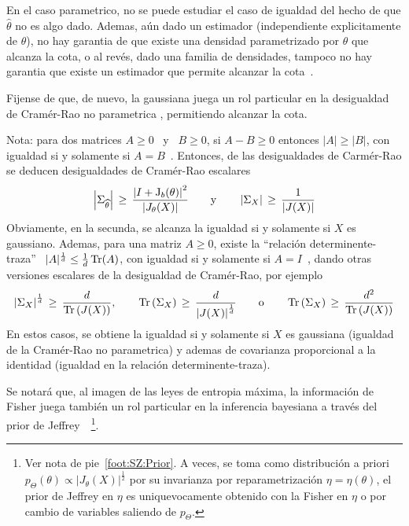 %
\noindent En el  caso parametrico, no se puede estudiar el  caso de igualdad del
hecho  de  que  $\widehat{\theta}$ no  es  algo  dado.   Ademas, a\'un  dado  un
estimador  (independiente explicitamente de  $\theta$), no  hay garantia  de que
existe  una  densidad parametrizado  por  $\theta$ que  alcanza  la  cota, o  al
rev\'es, dado una  familia de densidades, tampoco no hay  garantia que existe un
estimador que permite alcanzar la cota~\cite{CovTho06,  Kay93}.

Fijense de que, de nuevo, la gaussiana juega un rol particular en la desigualdad
de Cram\'er-Rao no parametrica , permitiendo alcanzar la cota.

Nota: para dos  matrices $A \ge 0$  \ y \ $B \ge  0$, si $A - B  \ge 0$ entonces
$|A|  \ge  |B|$,   con  igualdad  si  y  solamente   si  $A  =  B$~\cite[cap.~1,
teorema~25]{MagNeu99}.   Entonces,  de  las  desigualdades  de  Carm\'er-Rao  se
deducen     desigualdades     de     Cram\'er-Rao    escalares
%
\[
\left|   \Sigma_{\widehat{\theta}}  \right|   \,   \ge  \,   \frac{\left|  I   +
    \operatorname{J}_b(\theta) \right|^2}{\left| J_\theta(X) \right|} \qquad \mbox{y} \qquad
\left| \Sigma_X \right| \, \ge \, \frac{1}{\left| J(X) \right|}
\]
%
Obviamente,  en la secunda,  se alcanza  la igualdad  si y  solamente si  $X$ es
gaussiano.  Ademas,  para   una  matriz  $A  \ge  0$,   existe  la  ``relaci\'on
determinente-traza''  \ $|A|^{\frac1d} \le  \frac1d \operatorname{Tr}(A)$,  con igualdad  si y
solamente  si $A  = I$~\cite[cap.~11,  sec.~4]{MagNeu99}, dando  otras versiones
escalares de la desigualdad de Cram\'er-Rao, por ejemplo
%
\[
\left| \Sigma_X  \right|^{\frac1d} \,  \ge \, \frac{d}{\operatorname{Tr}\left(  J(X) \right)},
\qquad   \operatorname{Tr}\left(   \Sigma_X   \right)   \,   \ge   \,   \frac{d}{\left|   J(X)
  \right|^{\frac1d}} \qquad \mbox{o} \qquad \operatorname{Tr}\left( \Sigma_X \right) \, \ge \,
\frac{d^2}{\operatorname{Tr}\left( J(X) \right)}
\]
%
En  estos casos,  se obtiene  la igualdad  si y  solamente si  $X$  es gaussiana
(igualdad de la Cram\'er-Rao no parametrica) y ademas de covarianza proporcional
a la identidad (igualdad en la relaci\'on determinente-traza).

Se notar\'a que,  al imagen de las leyes de  entropia m\'axima, la informaci\'on
de  Fisher  juega tambi\'en  un  rol particular  en  la  inferencia bayesiana  a
trav\'es del  prior de Jeffrey~\cite{Jef46,  LehCas98, Rob07}~\footnote{Ver nota
  de pie~\ref{foot:SZ:Prior}.  A veces, se toma como distribuci\'on a priori
  $p_\Theta(\theta)  \propto   |J_\theta(X)|^\frac12$  por  su   invarianza  por
  reparametrizaci\'on $\eta =  \eta(\theta)$, \ie el prior de  Jeffrey en $\eta$
  es uniquevocamente obtenido con la Fisher  en $\eta$ o por cambio de variables
  saliendo de $p_\Theta$.}.

